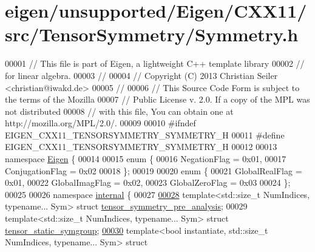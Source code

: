 \hypertarget{eigen_2unsupported_2_eigen_2_c_x_x11_2src_2_tensor_symmetry_2_symmetry_8h_source}{}\section{eigen/unsupported/\+Eigen/\+C\+X\+X11/src/\+Tensor\+Symmetry/\+Symmetry.h}
\label{eigen_2unsupported_2_eigen_2_c_x_x11_2src_2_tensor_symmetry_2_symmetry_8h_source}

\begin{DoxyCode}
00001 \textcolor{comment}{// This file is part of Eigen, a lightweight C++ template library}
00002 \textcolor{comment}{// for linear algebra.}
00003 \textcolor{comment}{//}
00004 \textcolor{comment}{// Copyright (C) 2013 Christian Seiler <christian@iwakd.de>}
00005 \textcolor{comment}{//}
00006 \textcolor{comment}{// This Source Code Form is subject to the terms of the Mozilla}
00007 \textcolor{comment}{// Public License v. 2.0. If a copy of the MPL was not distributed}
00008 \textcolor{comment}{// with this file, You can obtain one at http://mozilla.org/MPL/2.0/.}
00009 
00010 \textcolor{preprocessor}{#ifndef EIGEN\_CXX11\_TENSORSYMMETRY\_SYMMETRY\_H}
00011 \textcolor{preprocessor}{#define EIGEN\_CXX11\_TENSORSYMMETRY\_SYMMETRY\_H}
00012 
00013 \textcolor{keyword}{namespace }\hyperlink{namespace_eigen}{Eigen} \{
00014 
00015 \textcolor{keyword}{enum} \{
00016   NegationFlag           = 0x01,
00017   ConjugationFlag        = 0x02
00018 \};
00019 
00020 \textcolor{keyword}{enum} \{
00021   GlobalRealFlag         = 0x01,
00022   GlobalImagFlag         = 0x02,
00023   GlobalZeroFlag         = 0x03
00024 \};
00025 
00026 \textcolor{keyword}{namespace }\hyperlink{namespaceinternal}{internal} \{
00027 
\hyperlink{struct_eigen_1_1internal_1_1tensor__symmetry__pre__analysis}{00028} \textcolor{keyword}{template}<std::size\_t NumIndices, \textcolor{keyword}{typename}... Sym>                   \textcolor{keyword}{struct }
      \hyperlink{struct_eigen_1_1internal_1_1tensor__symmetry__pre__analysis}{tensor\_symmetry\_pre\_analysis};
00029 \textcolor{keyword}{template}<std::size\_t NumIndices, \textcolor{keyword}{typename}... Sym>                   \textcolor{keyword}{struct }
      \hyperlink{struct_eigen_1_1internal_1_1tensor__static__symgroup}{tensor\_static\_symgroup};
\hyperlink{struct_eigen_1_1internal_1_1tensor__static__symgroup__if}{00030} \textcolor{keyword}{template}<\textcolor{keywordtype}{bool} instantiate, std::size\_t NumIndices, \textcolor{keyword}{typename}... Sym> \textcolor{keyword}{struct }

\end{DoxyCode}
